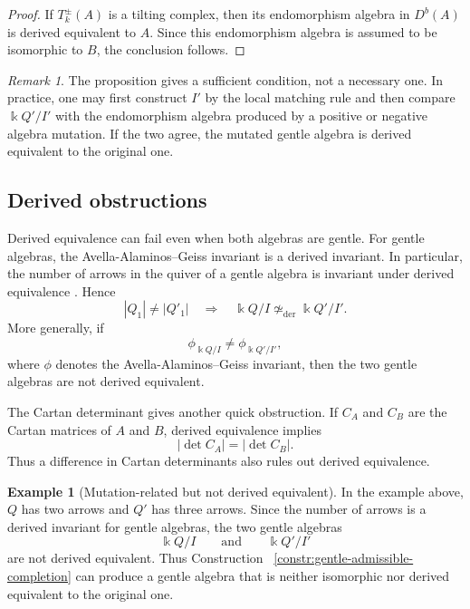 \documentclass[11pt]{article}
\newcommand{\K}{\Bbbk}
\theoremstyle{plain}
\theoremstyle{definition}
\newtheorem{example}[theorem]{Example}
\theoremstyle{remark}
\newtheorem{remark}[theorem]{Remark}
\begin{document}
\begin{proof}
If \(T_k^\pm(A)\) is a tilting complex, then its endomorphism algebra in
\(D^b(A)\) is derived equivalent to \(A\).  Since this endomorphism algebra is
assumed to be isomorphic to \(B\), the conclusion follows.
\end{proof}

\begin{remark}
The proposition gives a sufficient condition, not a necessary one.  In
practice, one may first construct \(I'\) by the local matching rule and then
compare \(\K Q'/I'\) with the endomorphism algebra produced by a positive or
negative algebra mutation.  If the two agree, the mutated gentle algebra is
derived equivalent to the original one.
\end{remark}

\subsection{Derived obstructions}

Derived equivalence can fail even when both algebras are gentle.  For gentle
algebras, the Avella-Alaminos--Geiss invariant is a derived invariant.  In
particular, the number of arrows in the quiver of a gentle algebra is invariant
under derived equivalence \cite{AvellaAlaminosGeiss}.  Hence
\[
  |Q_1|\neq |Q'_1|
  \quad\Longrightarrow\quad
  \K Q/I \not\simeq_{\mathrm{der}} \K Q'/I'.
\]
More generally, if
\[
  \phi_{\K Q/I}\neq \phi_{\K Q'/I'},
\]
where \(\phi\) denotes the Avella-Alaminos--Geiss invariant, then the two gentle
algebras are not derived equivalent.

The Cartan determinant gives another quick obstruction.  If \(C_A\) and
\(C_B\) are the Cartan matrices of \(A\) and \(B\), derived equivalence implies
\[
  |\det C_A|=|\det C_B|.
\]
Thus a difference in Cartan determinants also rules out derived equivalence.

\begin{example}[Mutation-related but not derived equivalent]
In the example above, \(Q\) has two arrows and \(Q'\) has three arrows.  Since
the number of arrows is a derived invariant for gentle algebras, the two gentle
algebras
\[
  \K Q/I
  \qquad\text{and}\qquad
  \K Q'/I'
\]
are not derived equivalent.  Thus Construction ~\ref{constr:gentle-admissible-completion}
can produce a gentle algebra that is neither isomorphic nor derived equivalent
to the original one.
\end{example}
\end{document}
